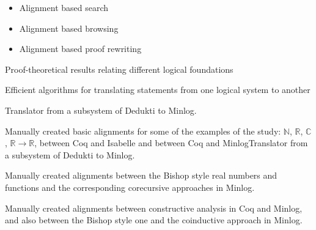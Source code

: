 \begin{workpackage}
\begin{tasklist}
  \begin{task}[id=alignservices,title=Alignment-Based Services,lead=Fau,FauRM=18,BolRM=14,InrRM=7]
    \begin{itemize}
    \item Alignment based search
    \item Alignment based browsing
    \item Alignment based proof rewriting
    \end{itemize}
  \end{task}
\end{tasklist}

\begin{wpdelivs}
  \begin{wpdeliv}[due=3,miles=startup,id=prooftheoretical,dissem=PU,nature=DEM,lead=Lee]
    {Proof-theoretical results relating different logical foundations}
  \end{wpdeliv}
  \begin{wpdeliv}[due=3,miles=startup,id=translatingstatements,dissem=PU,nature=DEM,lead=Lee]
    {Efficient algorithms for translating statements from one logical system to another}
  \end{wpdeliv}
  \begin{wpdeliv}[due=3,miles=startup,id=deduktitominilog,dissem=PU,nature=DEM,lead=Lmu]
    {Translator from a subsystem of Dedukti to Minlog. }
  \end{wpdeliv}
  \begin{wpdeliv}[due=3,miles=startup,id=aligningnumbers,dissem=PU,nature=DEM,lead=Str]
    {Manually created basic alignments for some of the examples of the
      study: $\mathbb{N}$, $\mathbb{R}$, $\mathbb{C}$, $\mathbb{R}
      \rightarrow \mathbb{R}$, between Coq and Isabelle and between
      Coq and MinlogTranslator from a subsystem of Dedukti to
      Minlog.}
  \end{wpdeliv}
  \begin{wpdeliv}[due=3,miles=startup,id=aligningnumbersminilog,dissem=PU,nature=DEM,lead=Lmu]
    {Manually created alignments between the Bishop style real numbers
      and functions and the corresponding corecursive approaches in
      Minlog.}
  \end{wpdeliv}
  \begin{wpdeliv}[due=3,miles=startup,id=aligningconstructiveanalysisminilog,dissem=PU,nature=DEM,lead=Lmu]
    {Manually created alignments between constructive analysis in Coq
      and Minlog, and also between the Bishop style one and the
      coinductive approach in Minlog.}

\end{wpdeliv}
\end{wpdelivs}
\end{workpackage}
